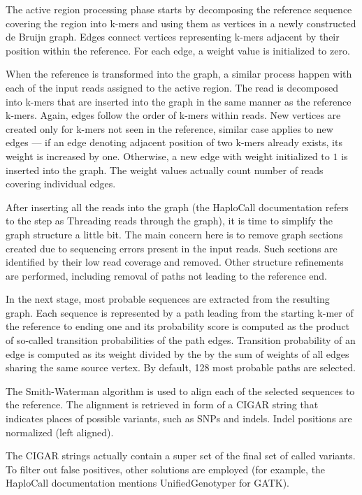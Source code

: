 The active region processing phase starts by decomposing the reference sequence covering the region into k-mers and using them as vertices in a newly constructed de Bruijn graph. Edges connect vertices representing k-mers adjacent by their position within the reference. For each edge, a weight value is initialized to zero. 

When the reference is transformed into the graph, a similar process happen with each of the input reads assigned to the active region. The read is decomposed into k-mers that are inserted into the graph in the same manner as the reference k-mers. Again, edges follow the order of k-mers within reads.  New vertices are created only for k-mers not seen in the reference, similar case applies to new edges --- if an edge denoting adjacent position of two k-mers already exists, its weight is increased by one. Otherwise, a new edge with weight initialized to $1$ is inserted into the graph. The weight values actually count number of reads covering individual edges. 

After inserting all the reads into the graph (the HaploCall documentation refers to the step as Threading reads through the graph), it is time to simplify the graph structure a little bit. The main concern here is to remove graph sections created due to sequencing errors present in the input reads. Such sections are identified by their low read coverage and removed. Other structure refinements are performed, including removal of paths not leading to the reference end. 

In the next stage, most probable sequences are extracted from the resulting graph. Each sequence is represented by a path leading from the starting k-mer of the reference to ending one and its probability score is computed as the product of so-called transition probabilities of the path edges. Transition probability of an edge is computed as its weight divided by the by the sum of weights of all edges sharing the same source vertex. By default, 128 most probable paths are selected. 

The Smith-Waterman algorithm is used to align each of the selected sequences to the reference. The alignment is retrieved in form of a CIGAR string that indicates places of possible variants, such as SNPs and indels. Indel positions are normalized (left aligned).  

The CIGAR strings actually contain a super set of the final set of called variants. To filter out false positives, other solutions are employed (for example, the HaploCall documentation mentions UnifiedGenotyper for GATK). 

